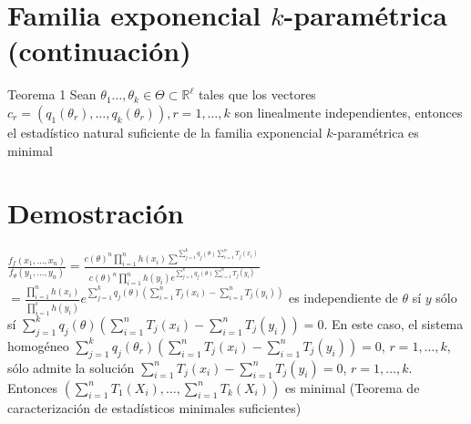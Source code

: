  \section*{Familia exponencial $k$-paramétrica (continuación)}
  Teorema 1 Sean $\theta_{1} \ldots, \theta_{k} \in \Theta \subset \mathbb{R}^{\ell}$ tales que los vectores $c_{r}=\left(q_{1}\left(\theta_{r}\right), \ldots, q_{k}\left(\theta_{r}\right)\right), r=1, \ldots, k$ son linealmente independientes, entonces el estadístico natural suficiente de la familia exponencial $k$-paramétrica es minimal
  
  \section*{Demostración}
  $\frac{f_{f}\left(x_{1}, \ldots, x_{n}\right)}{f_{\theta}\left(y_{1}, \ldots, y_{n}\right)}=\frac{c(\theta)^{n} \prod_{i=1}^{n} h\left(x_{i}\right) \sum^{\sum_{j=1}^{k} q_{j}(\theta) \sum_{i=1}^{n} T_{j}\left(x_{i}\right)}}{c(\theta)^{n} \prod_{i=1}^{n} h\left(y_{i}\right) e^{\sum_{j=1}^{k} q_{j}(\theta) \sum_{i=1}^{n} T_{j}\left(y_{i}\right)}}$\\
  $=\frac{\prod_{i=1}^{n} h\left(x_{i}\right)}{\prod_{i=1}^{i} h\left(y_{i}\right)} e^{\sum_{j=1}^{k} q_{j}(\theta)\left(\sum_{i=1}^{n} T_{j}\left(x_{i}\right)-\sum_{i=1}^{n} T_{j}\left(y_{i}\right)\right)}$ es independiente de $\theta$ sí $y$ sólo sí $\sum_{j=1}^{k} q_{j}(\theta)\left(\sum_{i=1}^{n} T_{j}\left(x_{i}\right)-\sum_{i=1}^{n} T_{j}\left(y_{i}\right)\right)=0$. En este caso, el sistema homogéneo $\sum_{j=1}^{k} q_{j}\left(\theta_{r}\right)\left(\sum_{i=1}^{n} T_{j}\left(x_{i}\right)-\sum_{i=1}^{n} T_{j}\left(y_{i}\right)\right)=0$, $r=1, \ldots, k$, sólo admite la solución $\sum_{i=1}^{n} T_{j}\left(x_{i}\right)-\sum_{i=1}^{n} T_{j}\left(y_{i}\right)=0$, $r=1, \ldots, k$. Entonces $\left(\sum_{i=1}^{n} T_{1}\left(X_{i}\right), \ldots, \sum_{i=1}^{n} T_{k}\left(X_{i}\right)\right)$ es minimal (Teorema de caracterización de estadísticos minimales suficientes)
  
